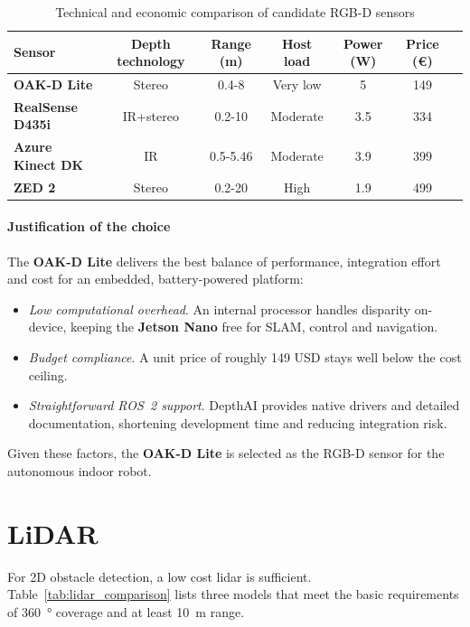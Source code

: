\begin{table}[H]
  \centering
  \begin{tabular}{l c c c c c c}
    \toprule
    \textbf{Sensor} &
    \textbf{Depth technology} &
    \textbf{Range (\si{\metre})} &
    \textbf{Host load} &
    \textbf{Power (\si{\watt})} &
    \textbf{Price (\euro)}\\
    \midrule
    \textbf{OAK-D Lite} & Stereo & 0.4-8 & Very low & 5 & 149\\
    \textbf{RealSense D435i} & IR+stereo & 0.2-10 & Moderate & 3.5 & 334\\
    \textbf{Azure Kinect DK} & IR & 0.5-5.46 & Moderate & 3.9 & 399\\
    \textbf{ZED 2} & Stereo & 0.2-20 & High & 1.9 & 499\\
    \bottomrule
  \end{tabular}
  \caption{Technical and economic comparison of candidate RGB-D sensors}
  \label{tab:rgbd_comparison}
\end{table}

\paragraph*{Justification of the choice}  
The \textbf{OAK-D Lite} delivers the best balance of performance, integration effort and cost for an embedded, battery-powered platform:

\begin{itemize}
  \item \textit{Low computational overhead}. An internal processor handles disparity on-device, keeping the \textbf{Jetson Nano} free for SLAM, control and navigation.
  \item \textit{Budget compliance}. A unit price of roughly 149 USD stays well below the cost ceiling.
  \item \textit{Straightforward ROS~2 support}. DepthAI provides native drivers and detailed documentation, shortening development time and reducing integration risk.
\end{itemize}

Given these factors, the \textbf{OAK-D Lite} is selected as the RGB-D sensor for the autonomous indoor robot.
\section{LiDAR}\label{subsec:lidar_selection}

For 2D obstacle detection, a low cost \gls{lidar} is sufficient. 
Table~\ref{tab:lidar_comparison} lists three models that meet the basic requirements of \SI{360}{\degree} coverage and at least \SI{10}{\metre} range.

